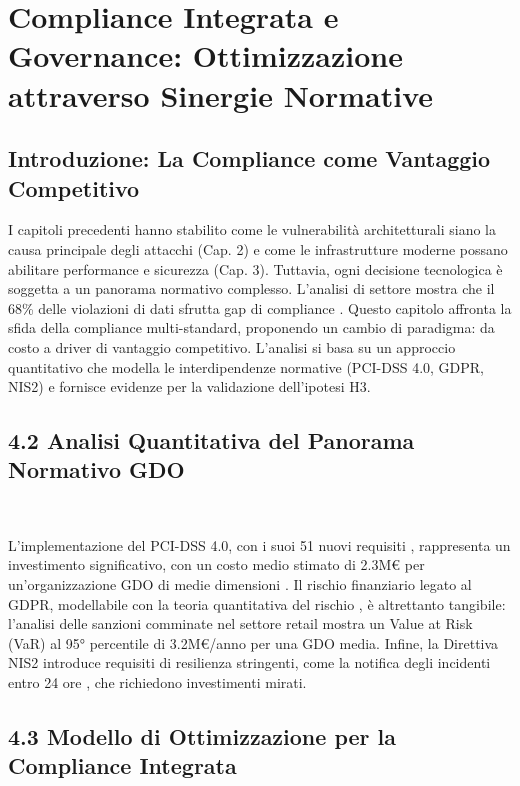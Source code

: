 \chapter{Compliance Integrata e Governance: Ottimizzazione attraverso Sinergie Normative}
\label{cap4_compliance_integration}

\section{Introduzione: La Compliance come Vantaggio Competitivo}

I capitoli precedenti hanno stabilito come le vulnerabilità architetturali siano la causa principale degli attacchi (Cap. 2) e come le infrastrutture moderne possano abilitare performance e sicurezza (Cap. 3). Tuttavia, ogni decisione tecnologica è soggetta a un panorama normativo complesso. L'analisi di settore mostra che il 68\% delle violazioni di dati sfrutta gap di compliance \autocite{verizon2024}. Questo capitolo affronta la sfida della compliance multi-standard, proponendo un cambio di paradigma: da costo a driver di vantaggio competitivo. L'analisi si basa su un approccio quantitativo che modella le interdipendenze normative (PCI-DSS 4.0, GDPR, NIS2) e fornisce evidenze per la validazione dell'ipotesi H3.

\section{4.2 Analisi Quantitativa del Panorama Normativo GDO}\

L'implementazione del PCI-DSS 4.0, con i suoi 51 nuovi requisiti \autocite{pcidss2024}, rappresenta un investimento significativo, con un costo medio stimato di 2.3M€ per un'organizzazione GDO di medie dimensioni \autocite{Gartner2024gdpr}. Il rischio finanziario legato al GDPR, modellabile con la teoria quantitativa del rischio \autocite{mcneil2015}, è altrettanto tangibile: l'analisi delle sanzioni comminate nel settore retail \autocite{EDPB2024} mostra un Value at Risk (VaR) al 95° percentile di 3.2M€/anno per una GDO media. Infine, la Direttiva NIS2 introduce requisiti di resilienza stringenti, come la notifica degli incidenti entro 24 ore \autocite{ENISA2024nis2}, che richiedono investimenti mirati.

\section{4.3 Modello di Ottimizzazione per la Compliance Integrata}

